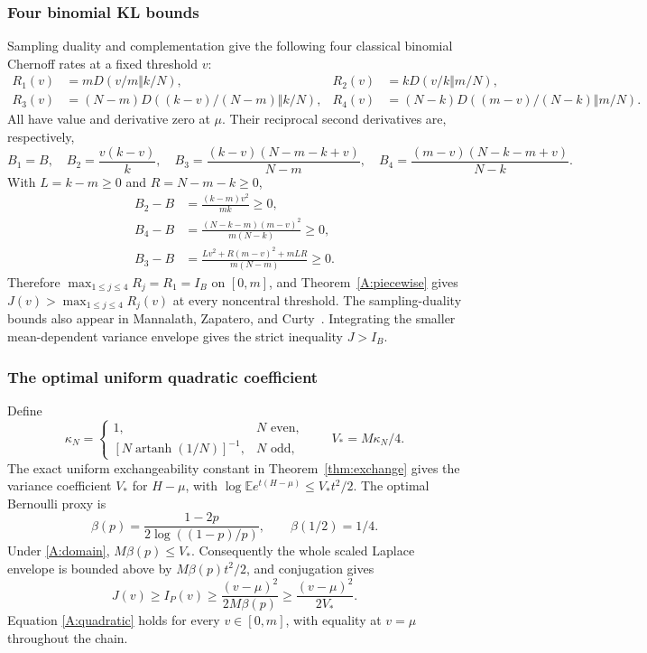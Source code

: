\documentclass[11pt,a4paper]{article}
\newcommand{\E}{\mathbb E}\newcommand{\R}{\mathbb R}\newcommand{\N}{\mathbb N}\newcommand{\one}{\mathbf1}
\begin{document}
\subsubsection{Four binomial KL bounds}
Sampling duality and complementation give the following four classical
binomial Chernoff rates at a fixed threshold $v$:
\begin{align*}
 R_1(v)&=mD(v/m\Vert k/N),&
 R_2(v)&=kD(v/k\Vert m/N),\\
 R_3(v)&=(N-m)D((k-v)/(N-m)\Vert k/N),&
 R_4(v)&=(N-k)D((m-v)/(N-k)\Vert m/N).
\end{align*}
All have value and derivative zero at $\mu$. Their reciprocal second
derivatives are, respectively,
\[
 B_1=B,\quad B_2=\frac{v(k-v)}k,\quad
 B_3=\frac{(k-v)(N-m-k+v)}{N-m},\quad
 B_4=\frac{(m-v)(N-k-m+v)}{N-k}.
\]
With $L=k-m\ge0$ and $R=N-m-k\ge0$,
\begin{align*}
 B_2-B&=\frac{(k-m)v^2}{mk}\ge0,\\
 B_4-B&=\frac{(N-k-m)(m-v)^2}{m(N-k)}\ge0,\\
 B_3-B&=\frac{Lv^2+R(m-v)^2+mLR}{m(N-m)}\ge0.
\end{align*}
Therefore $\max_{1\le j\le4}R_j=R_1=I_B$ on $[0,m]$, and
Theorem~\ref{A:piecewise} gives $J(v)>\max_{1\le j\le4}R_j(v)$ at every
noncentral threshold. The sampling-duality bounds also appear in
Mannalath, Zapatero, and Curty~\cite{A:MZC}. Integrating the smaller
mean-dependent variance envelope gives the strict inequality $J>I_B$.

\subsubsection{The optimal uniform quadratic coefficient}
Define
\[
 \kappa_N=\begin{cases}1,&N\text{ even},\\
 [N\operatorname{artanh}(1/N)]^{-1},&N\text{ odd},\end{cases}
 \qquad V_* = M\kappa_N/4.
\]
The exact uniform exchangeability constant in Theorem~\ref{thm:exchange} gives the variance coefficient $V_*$ for $H-\mu$, with
$\log\E e^{t(H-\mu)}\le V_*t^2/2$.
The optimal Bernoulli proxy is
\[
 \beta(p)=\frac{1-2p}{2\log((1-p)/p)},\qquad \beta(1/2)=1/4.
\]
Under \eqref{A:domain}, $M\beta(p)\le V_*$. Consequently the whole scaled
Laplace envelope is bounded above by $M\beta(p)t^2/2$, and conjugation gives
\begin{equation}\label{A:quadratic}
 J(v)\ge I_P(v)\ge \frac{(v-\mu)^2}{2M\beta(p)}
 \ge\frac{(v-\mu)^2}{2V_*}.
\end{equation}
Equation \eqref{A:quadratic} holds for every $v\in[0,m]$, with equality at $v=\mu$ throughout the chain.
\end{document}
